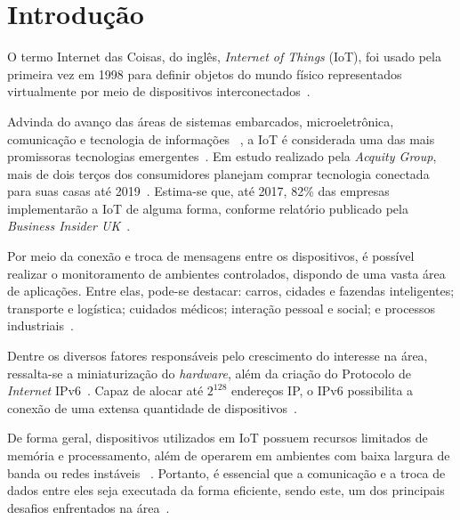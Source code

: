 \chapter{Introdução}

O termo Internet das Coisas, do inglês, \textit{Internet of Things} (IoT), foi usado pela primeira vez em 1998 para definir objetos do mundo físico representados virtualmente por meio de dispositivos interconectados~\cite{weber2010internet}. 

Advinda do avanço das áreas de sistemas embarcados, microeletrônica, comunicação e tecnologia de informações ~\cite{iot2016}, a IoT é considerada uma das mais promissoras tecnologias emergentes~\cite{gartner2015gartner}. Em estudo realizado pela \textit{Acquity Group}, mais de dois terços dos consumidores planejam comprar tecnologia conectada para suas casas até 2019~\cite{press2014internet}. Estima-se que, até 2017, 82\% das empresas implementarão a IoT de alguma forma, conforme relatório publicado pela \textit{Business Insider UK}~\cite{danova2014bi}.


Por meio da conexão e troca de mensagens entre os dispositivos, é possível realizar o monitoramento de ambientes controlados,  dispondo de uma vasta área de aplicações. Entre elas, pode-se destacar: carros, cidades e fazendas inteligentes; transporte e logística; cuidados médicos; interação pessoal e social; e processos industriais~\cite{sankarinternet, bandyopadhyay2011internet, atzori2010internet}.

Dentre os diversos fatores responsáveis pelo crescimento do interesse na área, ressalta-se a miniaturização do \textit{hardware}, além da criação do Protocolo de \textit{Internet} IPv6~\cite{press2014internet}. Capaz de alocar até $2^{128}$ endereços IP, o IPv6 possibilita a conexão de uma extensa quantidade de dispositivos~\cite{mukherjee2016ranking}.

De forma geral, dispositivos utilizados em IoT possuem recursos limitados de memória e processamento, além de operarem em ambientes com baixa largura de banda ou redes instáveis ~\cite{weber2010internet, iot2016, suo2012security}. Portanto, é essencial que a comunicação e a troca de dados entre eles seja executada da forma eficiente, sendo este, um dos principais desafios enfrentados na área~\cite{bandyopadhyay2011internet, suo2012security}.

